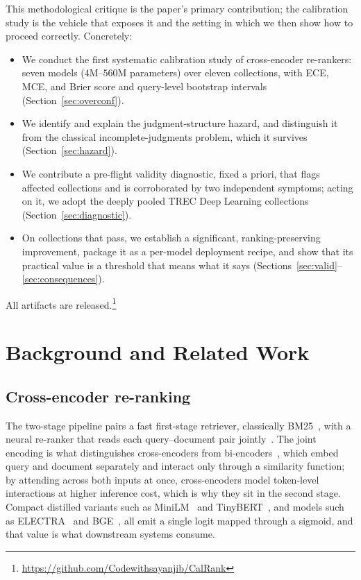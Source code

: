 \documentclass[sigconf,nonacm]{acmart}
\begin{document}
This methodological critique is the paper's primary contribution; the calibration
study is the vehicle that exposes it and the setting in which we then show how to
proceed correctly. Concretely:

\begin{itemize}[leftmargin=1.2em,itemsep=2pt]
  \item We conduct the first systematic calibration study of cross-encoder
  re-rankers: seven models ($4$M--$560$M parameters) over eleven collections, with
  ECE, MCE, and Brier score and query-level bootstrap intervals
  (Section~\ref{sec:overconf}).
  \item We identify and explain the judgment-structure hazard, and distinguish it
  from the classical incomplete-judgments problem, which it survives
  (Section~\ref{sec:hazard}).
  \item We contribute a pre-flight validity diagnostic, fixed a priori, that flags
  affected collections and is corroborated by two independent symptoms; acting on it,
  we adopt the deeply pooled TREC Deep Learning collections
  (Section~\ref{sec:diagnostic}).
  \item On collections that pass, we establish a significant, ranking-preserving
  improvement, package it as a per-model deployment recipe, and show that its
  practical value is a threshold that means what it says
  (Sections~\ref{sec:valid}--\ref{sec:consequences}).
\end{itemize}

All artifacts are released.\footnote{\url{https://github.com/Codewithsayanjib/CalRank}}

\section{Background and Related Work}\label{sec:related}

\subsection{Cross-encoder re-ranking}
The two-stage pipeline pairs a fast first-stage retriever, classically
BM25~\cite{robertson2009bm25}, with a neural re-ranker that reads each query--document
pair jointly~\cite{nogueira2019}. The joint encoding is what distinguishes
cross-encoders from bi-encoders~\cite{reimers2019sbert}, which embed query and
document separately and interact only through a similarity function; by attending
across both inputs at once, cross-encoders model token-level interactions at higher
inference cost, which is why they sit in the second stage. Compact distilled variants
such as MiniLM~\cite{wang2020minilm} and TinyBERT~\cite{jiao2020tinybert}, and models
such as ELECTRA~\cite{clark2020electra} and BGE~\cite{xiao2023bge}, all emit a single
logit mapped through a sigmoid, and that value is what downstream systems consume.
\end{document}
